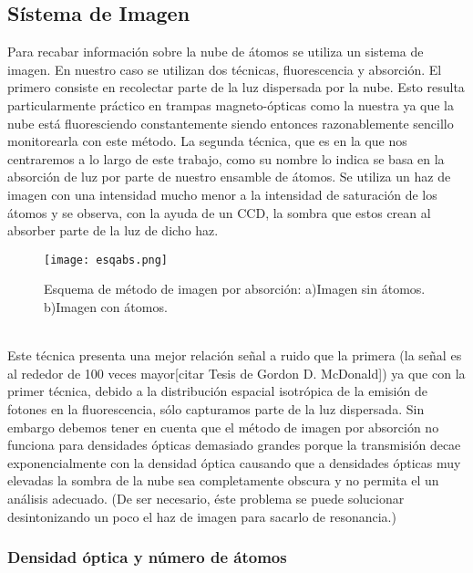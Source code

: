 \documentclass[12pt,twoside]{article}
\begin{document}
\subsection{Sístema de Imagen}\label{absorción}

Para recabar información sobre la nube de átomos se utiliza un sistema de imagen. En nuestro caso se utilizan dos técnicas, fluorescencia y absorción. 
El primero consiste en recolectar parte de la luz dispersada por la nube. Esto resulta particularmente práctico en trampas magneto-ópticas como la nuestra ya que la nube está fluoresciendo constantemente siendo entonces razonablemente sencillo monitorearla con este método. La segunda técnica, que es en la que nos centraremos a lo largo de este trabajo, como su nombre lo indica se basa en la absorción de luz por parte de nuestro ensamble de átomos. Se utiliza un haz de imagen con una intensidad mucho menor a la intensidad de saturación de los átomos y se observa, con la ayuda de un CCD, la sombra que estos crean al absorber parte de la luz de dicho haz.\\
\begin{figure}[h]
    \begin{center}
        \texttt{[image: esqabs.png]}
    \end{center}
    \caption{Esquema de método de imagen por absorción: a)Imagen sin átomos. b)Imagen con átomos. }
    \label{esqimgabs}
\end{figure} \\
Este técnica presenta una mejor relación señal a ruido que la primera (la señal es al rededor de 100 veces mayor[citar Tesis de Gordon D. McDonald]) ya que con la primer técnica, debido a la distribución espacial isotrópica de la emisión de fotones en la fluorescencia, sólo capturamos parte de la luz dispersada. Sin embargo debemos tener en cuenta que el método de imagen por absorción no funciona para densidades ópticas demasiado grandes porque la transmisión decae exponencialmente con la densidad óptica causando que a densidades ópticas muy elevadas la sombra de la nube sea completamente obscura y no permita el un análisis adecuado. (De ser necesario, éste problema se puede solucionar desintonizando un poco el haz de imagen para sacarlo de resonancia.)\\ 
\subsubsection{Densidad óptica y número de átomos}\label{teoDOynum}
\end{document}
